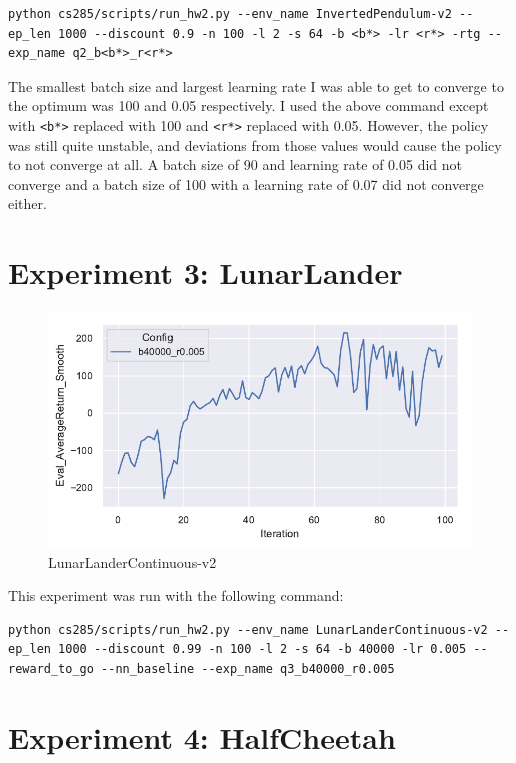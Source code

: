\documentclass[letterpaper, 10pt]{article}
\begin{document}
\begin{lstlisting}[caption=Exact command line configurations]
python cs285/scripts/run_hw2.py --env_name InvertedPendulum-v2 --ep_len 1000 --discount 0.9 -n 100 -l 2 -s 64 -b <b*> -lr <r*> -rtg --exp_name q2_b<b*>_r<r*>
\end{lstlisting}

The smallest batch size and largest learning rate I was able to get to converge to the optimum was 100 and 0.05 respectively. I 
used the above command except with \texttt{<b*>} replaced with 100 and \texttt{<r*>} replaced with 0.05. However, the policy
was still quite unstable, and deviations from those values would cause the policy to not converge at all. A batch size of 90
and learning rate of 0.05 did not converge and a batch size of 100 with a learning rate of 0.07 did not converge either. 

\newpage

\section{Experiment 3: LunarLander}

\begin{figure}[h]
\centering
\includegraphics{figures/q3.pdf}
\caption{LunarLanderContinuous-v2}
\end{figure}

This experiment was run with the following command:
\begin{lstlisting}[caption=Exact command line configurations]
python cs285/scripts/run_hw2.py --env_name LunarLanderContinuous-v2 --ep_len 1000 --discount 0.99 -n 100 -l 2 -s 64 -b 40000 -lr 0.005 --reward_to_go --nn_baseline --exp_name q3_b40000_r0.005
\end{lstlisting}

\newpage
\section{Experiment 4: HalfCheetah}
\end{document}
